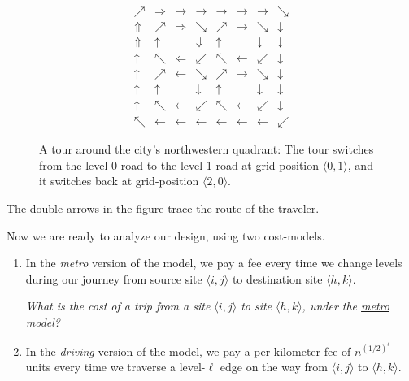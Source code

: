 \begin{enumerate}
{\begin{itemize}
\begin{figure}
\[
\begin{array}{c|ccc|ccc|c}
\nearrow & \Rightarrow & \rightarrow & \rightarrow & \rightarrow & \rightarrow & \rightarrow & \searrow \\
\hline
\Uparrow & \nearrow & \Rightarrow & \searrow     & \nearrow  & \rightarrow & \searrow         & \downarrow \\
\Uparrow & \uparrow &                   & \Downarrow & \uparrow &                    & \downarrow    & \downarrow \\
\uparrow & \nwarrow & \Leftarrow    & \swarrow    & \nwarrow & \leftarrow    & \swarrow       & \downarrow \\
\hline
\uparrow & \nearrow & \leftarrow    & \searrow     & \nearrow  & \rightarrow  & \searrow      & \downarrow \\
\uparrow & \uparrow &                    & \downarrow & \uparrow &                    & \downarrow  & \downarrow \\
\uparrow & \nwarrow & \leftarrow    & \swarrow     & \nwarrow & \leftarrow     & \swarrow    & \downarrow \\
\hline
\nwarrow & \leftarrow & \leftarrow & \leftarrow & \leftarrow & \leftarrow & \leftarrow                     & \swarrow
\end{array}
\]
\caption{A tour around the city's northwestern quadrant: The tour switches from the level-0 road to the level-1 road at grid-position $\langle 0,1 \rangle$, and it switches back at grid-position $\langle 2,0 \rangle$.}
\label{fig:PeripheralRoads2}
\end{figure}
The double-arrows in the figure trace the route of the traveler.
 \end{itemize}

\medskip

Now we are ready to analyze our design, using two cost-models.  
  \begin{enumerate}
  \item
In the {\em metro} version of the model, we pay a fee every time we change levels during our journey from source site $\langle i,j \rangle$ to destination site $\langle h,k \rangle$.

\smallskip

{\em What is the cost of a trip from a site $\langle i,j \rangle$ to site $\langle h,k \rangle$, under the \underline{metro} model?}

  \medskip\item
In the {\em driving} version of the model, we pay a per-kilometer fee of $n^{(1/2)^\ell}$ units every time we traverse a level-$\ell$ edge on the way from $\langle i,j \rangle$ to $\langle h,k \rangle$.
 

\end{enumerate}}
\end{enumerate}
